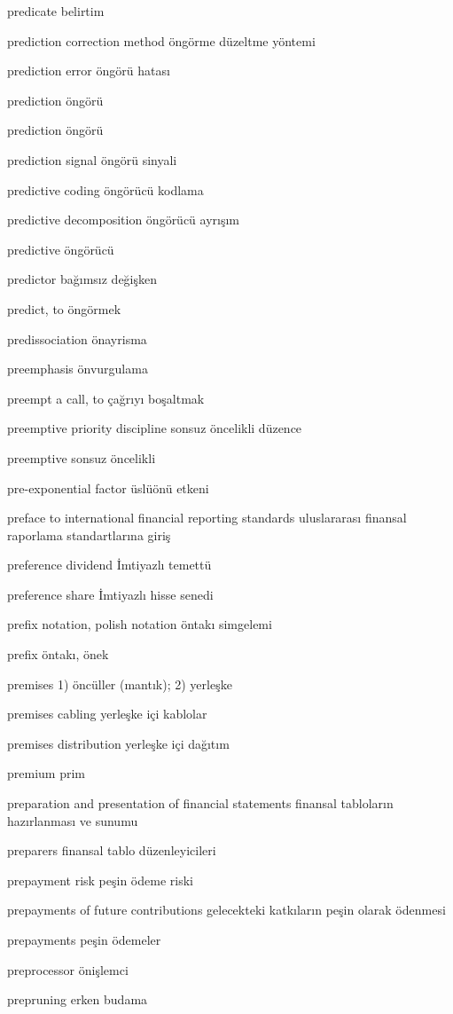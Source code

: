 \documentclass[12pt,fleqn]{article}\usepackage{../../common}
\begin{document}
predicate belirtim

prediction correction method öngörme düzeltme yöntemi

prediction error öngörü hatası

prediction öngörü

prediction öngörü

prediction signal öngörü sinyali

predictive coding öngörücü kodlama

predictive decomposition öngörücü ayrışım

predictive öngörücü

predictor bağımsız değişken

predict, to öngörmek

predissociation önayrisma

preemphasis önvurgulama

preempt a call, to çağrıyı boşaltmak

preemptive priority discipline sonsuz öncelikli düzence

preemptive sonsuz öncelikli

pre-exponential factor üslüönü etkeni

preface to international financial reporting standards uluslararası finansal raporlama standartlarına giriş

preference dividend İmtiyazlı temettü

preference share İmtiyazlı hisse senedi

prefix notation, polish notation öntakı simgelemi

prefix öntakı, önek

premises 1) öncüller (mantık); 2) yerleşke

premises cabling yerleşke içi kablolar

premises distribution yerleşke içi dağıtım

premium prim

preparation and presentation of financial statements finansal tabloların hazırlanması ve sunumu

preparers finansal tablo düzenleyicileri

prepayment risk peşin ödeme riski

prepayments of future contributions gelecekteki katkıların peşin olarak ödenmesi

prepayments peşin ödemeler

preprocessor önişlemci

prepruning erken budama
\end{document}
